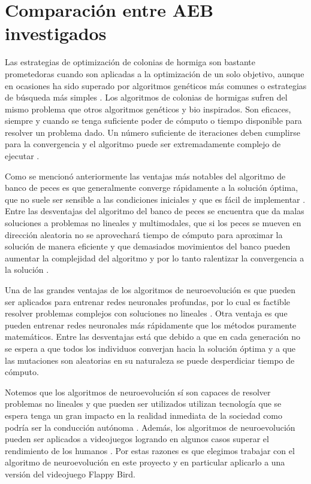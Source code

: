 \documentclass[twocolumn,spanish]{revtex4-1}
\begin{document}
\section{Comparación entre AEB investigados}
Las estrategias de optimización de colonias de hormiga son bastante prometedoras cuando son aplicadas a la optimización de un solo objetivo, aunque en ocasiones ha sido superado por  algoritmos genéticos más comunes o estrategias de búsqueda más simples \cite{lopez2010automatic}. Los algoritmos de colonias de hormigas sufren del mismo problema que otros algoritmos genéticos y bio inspirados. Son eficaces, siempre y cuando se tenga suficiente poder de cómputo o tiempo disponible para resolver un problema dado. Un número suficiente de iteraciones deben cumplirse para la convergencia y el algoritmo puede ser extremadamente complejo de ejecutar \cite{fan2020review}. 

Como se mencionó anteriormente las ventajas más notables del algoritmo de banco de peces es que generalmente converge rápidamente a la solución óptima, que no suele ser sensible a las condiciones iniciales y que es fácil de implementar \cite{tian2009improved}. Entre las desventajas del algoritmo del banco de peces se encuentra que da malas soluciones a problemas no lineales y multimodales, que si los peces se mueven en dirección aleatoria no se aprovechará tiempo de cómputo para aproximar la solución de manera eficiente y que demasiados movimientos del banco pueden aumentar la complejidad del algoritmo y por lo tanto ralentizar la convergencia a la solución \cite{peng2018modification}.

Una de las grandes ventajas de los algoritmos de neuroevolución es que pueden ser aplicados para entrenar redes neuronales profundas, por lo cual es factible resolver problemas complejos con soluciones no lineales \cite{stanley2017welcoming,such2017deep}. Otra ventaja es que pueden entrenar redes neuronales más rápidamente que los métodos puramente matemáticos. Entre las desventajas está que debido a que en cada generación no se espera a que todos los individuos converjan hacia la solución óptima y a que las mutaciones son aleatorias en su naturaleza se puede desperdiciar tiempo de cómputo.

Notemos que los algoritmos de neuroevolución sí son capaces de resolver problemas no lineales y que pueden ser utilizados utilizan tecnología que se espera tenga un gran impacto en la realidad inmediata de la sociedad como podría ser la conducción autónoma \cite{goodfellow2016deep,stanley2017welcoming}. Además, los algoritmos de neuroevolución pueden ser aplicados a videojuegos logrando en algunos casos superar el rendimiento de los humanos \cite{mnih2015human}. Por estas razones es que elegimos trabajar con el algoritmo de neuroevolución en este proyecto y en particular aplicarlo a una versión del videojuego Flappy Bird.
\end{document}

